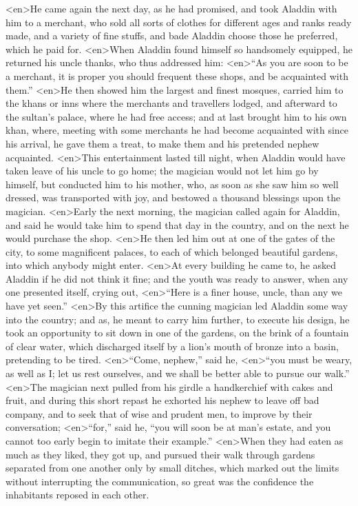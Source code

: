 <en>He came again the next day, as he had promised, and took Aladdin with him to a merchant, who sold all sorts of clothes for different ages and ranks ready made, and a variety of fine stuffs, and bade Aladdin choose those he preferred, which he paid for.
<en>When Aladdin found himself so handsomely equipped, he returned his uncle thanks, who thus addressed him: 
<en>“As you are soon to be a merchant, it is proper you should frequent these shops, and be acquainted with them.”
<en>He then showed him the largest and finest mosques, carried him to the khans or inns where the merchants and travellers lodged, and afterward to the sultan’s palace, where he had free access; and at last brought him to his own khan, where, meeting with some merchants he had become acquainted with since his arrival, he gave them a treat, to make them and his pretended nephew acquainted.
<en>This entertainment lasted till night, when Aladdin would have taken leave of his uncle to go home; the magician would not let him go by himself, but conducted him to his mother, who, as soon as she saw him so well dressed, was transported with joy, and bestowed a thousand blessings upon the magician.
<en>Early the next morning, the magician called again for Aladdin, and said he would take him to spend that day in the country, and on the next he would purchase the shop.
<en>He then led him out at one of the gates of the city, to some magnificent palaces, to each of which belonged beautiful gardens, into which anybody might enter.
<en>At every building he came to, he asked Aladdin if he did not think it fine; and the youth was ready to answer, when any one presented itself, crying out, 
<en>“Here is a finer house, uncle, than any we have yet seen.” 
<en>By this artifice the cunning magician led Aladdin some way into the country; and as, he meant to carry him further, to execute his design, he took an opportunity to sit down in one of the gardens, on the brink of a fountain of clear water, which discharged itself by a lion’s mouth of bronze into a basin, pretending to be tired.
<en>“Come, nephew,” said he, 
<en>“you must be weary, as well as I; let us rest ourselves, and we shall be better able to pursue our walk.”
<en>The magician next pulled from his girdle a handkerchief with cakes and fruit, and during this short repast he exhorted his nephew to leave off bad company, and to seek that of wise and prudent men, to improve by their conversation; 
<en>“for,” said he, “you will soon be at man’s estate, and you cannot too early begin to imitate their example.” 
<en>When they had eaten as much as they liked, they got up, and pursued their walk through gardens separated from one another only by small ditches, which marked out the limits without interrupting the communication, so great was the confidence the inhabitants reposed in each other.
